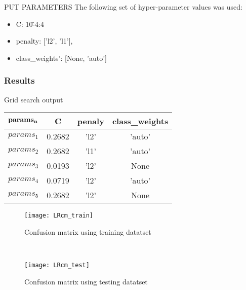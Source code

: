 PUT PARAMETERS
The following set of hyper-parameter values was used:
\begin{itemize}
\item C: 10\^-4:4
\item penalty: ['l2', 'l1'],
\item class\_weights': [None, 'auto']
\end{itemize}
\subsubsection{Results}
Grid search output
\begin{center}
 \begin{tabular}{ | l | c | c | c |}
   \hline
   $\bf{params_n}$ & \bf{C} &  \bf{penaly} & \bf{class\_weights} \\ \hline
   $params_1$ & 0.2682 & 'l2' & 'auto' \\ \hline
   $params_2$ & 0.2682 & 'l1' & 'auto' \\ \hline
   $params_3$ & 0.0193 & 'l2' & None \\ \hline
   $params_4$ & 0.0719 & 'l2' & 'auto' \\ \hline
   $params_5$ & 0.2682 & 'l2' & None \\ \hline
 \end{tabular}
\end{center}
\vspace{5mm}
\begin{figure}[h!]
    \centering
    \texttt{[image: LRcm\_train]}
    \caption{Confusion matrix using training datatset}
    \label{fig:LRcm_train}
\end{figure}\\
\begin{figure}[h!]
    \centering
    \texttt{[image: LRcm\_test]}
    \caption{Confusion matrix using testing datatset}
    \label{fig:LRcm_test}
\end{figure}\\